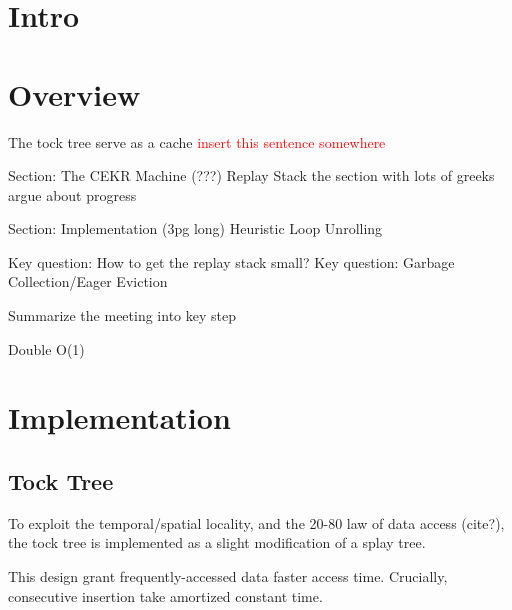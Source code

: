 \documentclass[acmsmall]{acmart}
\newcommand\todo[1]{\textcolor{red}{#1}}
\begin{document}
		
	
	
	\maketitle
	\section{Intro}
	\section{Overview}	
The tock tree serve as a cache \todo{insert this sentence somewhere}

Section: The CEKR Machine (???)
Replay Stack
the section with lots of greeks
argue about progress

Section: Implementation (3pg long)
Heuristic
Loop Unrolling

Key question: How to get the replay stack small?
Key question: Garbage Collection/Eager Eviction

Summarize the meeting into key step

Double O(1)
	
	
	
	\section{Implementation}
	\subsection{Tock Tree}
	To exploit the temporal/spatial locality, and the 20-80 law of data access (cite?), the tock tree is implemented as a slight modification of a splay tree.

	This design grant frequently-accessed data faster access time. Crucially, consecutive insertion take amortized constant time.
	
\end{document}

